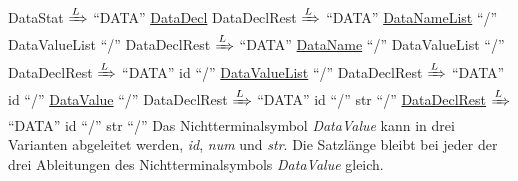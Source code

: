 \documentclass[11pt, a4paper, twoside]{article}   	%
\begin{document}
\parindent0pt DataStat $\xRightarrow{L}$ \enquote{DATA} \underline{DataDecl} DataDeclRest
\newline
\null\hspace{1.55cm} $\xRightarrow{L}$ \enquote{DATA} \underline{DataNameList} \enquote{/} DataValueList \enquote{/} DataDeclRest
\newline
\null\hspace{1.55cm} $\xRightarrow{L}$ \enquote{DATA} \underline{DataName} \enquote{/} DataValueList \enquote{/} DataDeclRest
\newline
\null\hspace{1.55cm} $\xRightarrow{L}$ \enquote{DATA} id \enquote{/} \underline{DataValueList} \enquote{/} DataDeclRest
\newline
\null\hspace{1.55cm} $\xRightarrow{L}$ \enquote{DATA} id \enquote{/} \underline{DataValue} \enquote{/} DataDeclRest
\newline
\null\hspace{1.55cm} $\xRightarrow{L}$ \enquote{DATA} id \enquote{/} str  \enquote{/} \underline{DataDeclRest}
\newline
\null\hspace{1.55cm} $\xRightarrow{L}$ \enquote{DATA} id \enquote{/} str  \enquote{/}
\newline
\newline
Das Nichtterminalsymbol \emph{DataValue} kann in drei Varianten abgeleitet werden, \emph{id}, \emph{num} und \emph{str}. Die Satzlänge bleibt bei jeder der drei Ableitungen des Nichtterminalsymbols \emph{DataValue} gleich.
\end{document}
